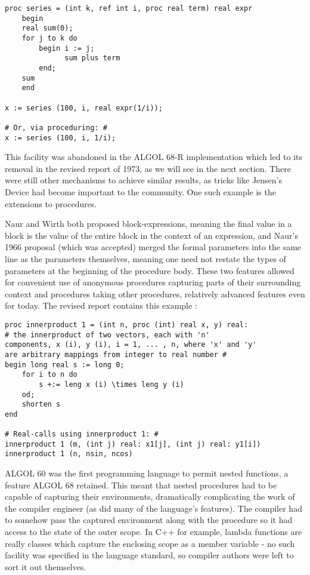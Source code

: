 \begin{lstlisting}[language=algol,frame=single]
proc series = (int k, ref int i, proc real term) real expr
    begin
    real sum(0);
    for j to k do
        begin i := j;
              sum plus term
        end;
    sum
    end

x := series (100, i, real expr(1/i));

# Or, via proceduring: #
x := series (100, i, 1/i);
\end{lstlisting}

This facility was abandoned in the ALGOL 68-R implementation which
led to its removal in the revised report of 1973,
as we will see in the next section.
There were still other mechanisms to achieve similar results,
as tricks like Jensen's Device had become important to the community.
One such example is the extensions to procedures.

Naur and Wirth both proposed block-expressions, meaning the final value in a block
is the value of the entire block in the context of an expression, and Naur's
1966 proposal (which was accepted) merged the formal parameters into the same line as
the parameters themselves, meaning one need not restate the types of parameters
at the beginning of the procedure body.
These two features allowed for convenient use of anonymous procedures capturing
parts of their surrounding context and procedures taking other procedures,
relatively advanced features even for today.
The revised report contains this example
\cite[Section 11.2, Innerproduct 1]{revised_report_on_the_algorithmic_language_algol_68_1976}:

\begin{lstlisting}[language=algol,frame=single]
proc innerproduct 1 = (int n, proc (int) real x, y) real:
# the innerproduct of two vectors, each with 'n'
components, x (i), y (i), i = 1, ... , n, where 'x' and 'y'
are arbitrary mappings from integer to real number #
begin long real s := long 0;
    for i to n do
        s +:= leng x (i) \times leng y (i)
    od;
    shorten s
end

# Real-calls using innerproduct 1: #
innerproduct 1 (m, (int j) real: x1[j], (int j) real: y1[i])
innerproduct 1 (n, nsin, ncos)
\end{lstlisting}

ALGOL 60 was the first programming language to permit
nested functions, a feature ALGOL 68 retained.
This meant that nested procedures had to be capable of capturing
their environments, dramatically complicating the work of the compiler
engineer (as did many of the language's features).
The compiler had to somehow pass the captured environment along with the
procedure so it had access to the state of the outer scope.
In C++ for example, lambda functions are really classes
which capture the enclosing scope as a member variable - no such facility
was specified in the language standard, so compiler authors were left to
sort it out themselves.


